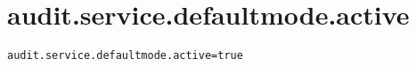 \section{audit.service.defaultmode.active}
\label{configuration:AuditServiceDefaultmodeActive}
\ClearAPI
\TODO
{}
\begin{lstlisting}[style=Props,caption={Usage example for \textit{audit.service.defaultmode.active}}]
audit.service.defaultmode.active=true
\end{lstlisting}